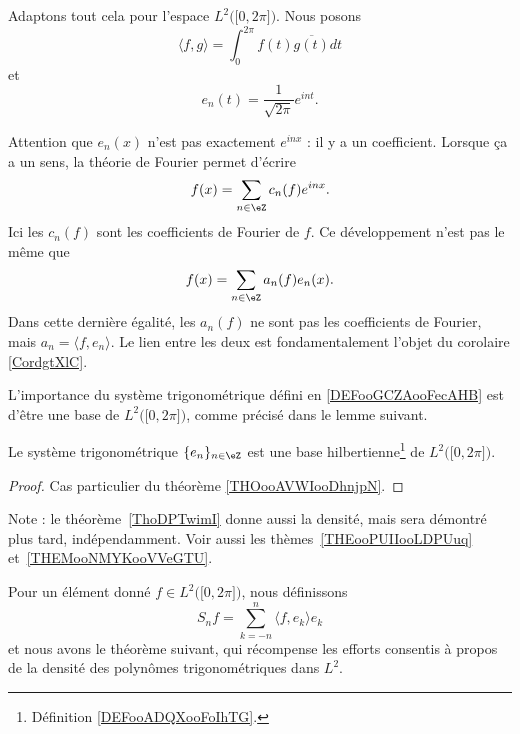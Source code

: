 \begin{normaltext}
	Adaptons tout cela pour l'espace \( L^2\big( \mathopen[ 0 , 2\pi \mathclose] \big)\). Nous posons
	\begin{equation}        \label{EQooBFKDooMkCZOt}
		\langle f, g\rangle =\int_0^{2\pi}f(t)\overline{ g(t) }dt
	\end{equation}
	et
	\begin{equation}        \label{EQooKMYOooLZCNap}
		e_n(t)=\frac{1}{ \sqrt{ 2\pi } } e^{int}.
	\end{equation}
\end{normaltext}

\begin{normaltext}
	Attention que \( e_n(x)\) n'est pas exactement \(  e^{inx}\) : il y a un coefficient. Lorsque ça a un sens, la théorie de Fourier permet d'écrire
	\begin{equation}
		f(x)=\sum_{n\in \eZ}c_n(f) e^{inx}.
	\end{equation}
	Ici les \( c_n(f)\) sont les coefficients de Fourier de \( f\). Ce développement n'est pas le même que
	\begin{equation}
		f(x)=\sum_{n\in \eZ}a_n(f)e_n(x).
	\end{equation}
	Dans cette dernière égalité, les \( a_n(f)\) ne sont pas les coefficients de Fourier, mais \( a_n=\langle f, e_n\rangle \). Le lien entre les deux est fondamentalement l'objet du corolaire \ref{CordgtXlC}.
\end{normaltext}


L'importance du système trigonométrique défini en \ref{DEFooGCZAooFecAHB} est d'être une base de \( L^2\big( \mathopen[ 0 , 2\pi \mathclose] \big)\), comme précisé dans le lemme suivant.
\begin{lemma}       \label{LEMooBJDQooLVPczR}
	Le système trigonométrique \( \{ e_n \}_{n\in \eZ}\) est une base hilbertienne\footnote{Définition \ref{DEFooADQXooFoIhTG}.} de \( L^2\big( \mathopen[ 0 , 2\pi \mathclose] \big)\).
\end{lemma}

\begin{proof}
	Cas particulier du théorème \ref{THOooAVWIooDhnjpN}.
\end{proof}

Note : le théorème~\ref{ThoDPTwimI} donne aussi la densité, mais sera démontré plus tard, indépendamment. Voir aussi les thèmes~\ref{THEooPUIIooLDPUuq} et~\ref{THEMooNMYKooVVeGTU}.

Pour un élément donné \( f\in L^2\big( \mathopen[ 0 , 2\pi \mathclose] \big)\), nous définissons
\begin{equation}
	S_nf=\sum_{k=-n}^n\langle f, e_k\rangle e_k
\end{equation}
et nous avons le théorème suivant, qui récompense les efforts consentis à propos de la densité des polynômes trigonométriques dans \( L^2\).

